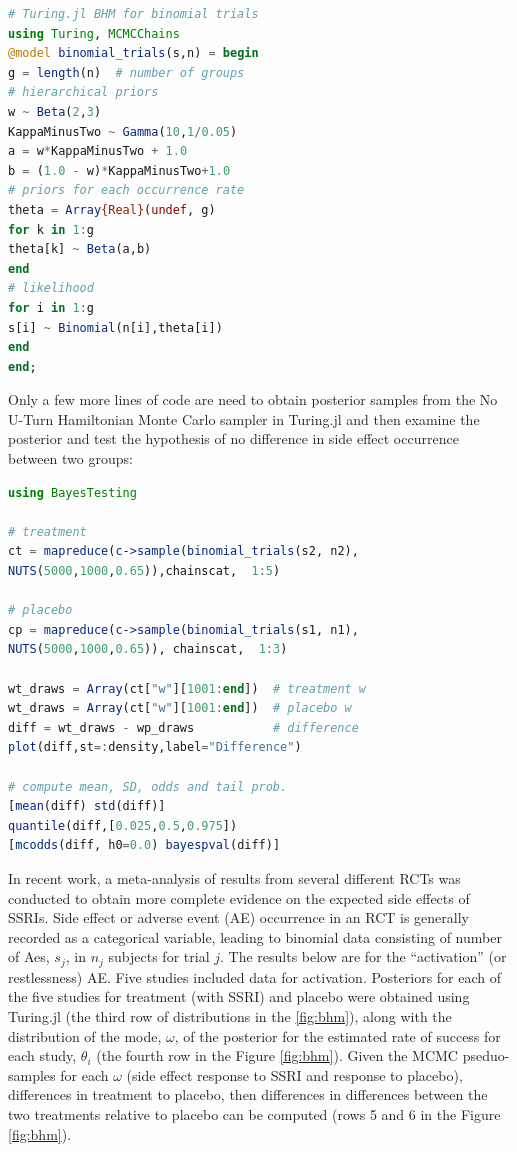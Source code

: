 \documentclass{juliacon}
\begin{document}
\begin{lstlisting}[language = Julia]
# Turing.jl BHM for binomial trials
using Turing, MCMCChains
@model binomial_trials(s,n) = begin
g = length(n)  # number of groups
# hierarchical priors
w ~ Beta(2,3)
KappaMinusTwo ~ Gamma(10,1/0.05) 
a = w*KappaMinusTwo + 1.0
b = (1.0 - w)*KappaMinusTwo+1.0
# priors for each occurrence rate
theta = Array{Real}(undef, g)
for k in 1:g
theta[k] ~ Beta(a,b)
end
# likelihood
for i in 1:g
s[i] ~ Binomial(n[i],theta[i])
end
end;
\end{lstlisting}

Only a few more lines of code are need to obtain posterior samples from the No U-Turn Hamiltonian Monte Carlo sampler in Turing.jl and then examine the posterior and test the hypothesis of no difference in side effect occurrence between two groups:
\begin{lstlisting}[language = Julia]
using BayesTesting

# treatment
ct = mapreduce(c->sample(binomial_trials(s2, n2),  
NUTS(5000,1000,0.65)),chainscat,  1:5)

# placebo
cp = mapreduce(c->sample(binomial_trials(s1, n1), 
NUTS(5000,1000,0.65)), chainscat,  1:3)

wt_draws = Array(ct["w"][1001:end])  # treatment w
wt_draws = Array(ct["w"][1001:end])  # placebo w
diff = wt_draws - wp_draws           # difference
plot(diff,st=:density,label="Difference")

# compute mean, SD, odds and tail prob.
[mean(diff) std(diff)]
quantile(diff,[0.025,0.5,0.975])
[mcodds(diff, h0=0.0) bayespval(diff)]
\end{lstlisting}

In recent work,\cite{Mills2019b} a meta-analysis of results from several different RCTs was conducted to obtain more complete evidence on the expected side effects of SSRIs.  Side effect or adverse event (AE) occurrence in an RCT is generally recorded as a categorical variable, leading to binomial data consisting of number of Aes, $s_j$, in $n_j$ subjects for trial $j$. The results below are for the  “activation” (or restlessness) AE.  Five studies included data for activation.  Posteriors for each of the five studies for treatment (with SSRI) and placebo were obtained using Turing.jl (the third row of distributions in the \ref{fig:bhm}), along with the distribution of the mode, $\omega$, of the posterior for the estimated rate of success for each study, $\theta_i$ (the fourth row in the Figure \ref{fig:bhm}).  Given the MCMC pseduo-samples for each $\omega$ (side effect response to SSRI and response to placebo), differences in treatment to placebo, then differences in differences between the two treatments relative to placebo can be computed (rows 5 and 6 in the Figure \ref{fig:bhm}).
\vskip 6pt
\end{document}
